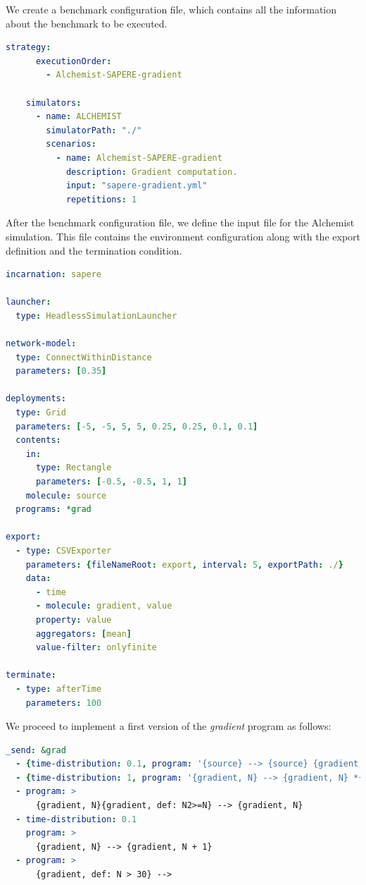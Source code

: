 \documentclass[12pt,a4paper,openright,twoside]{book}
\begin{document}
We create a benchmark configuration file, which contains all the information about the benchmark to be executed.

\begin{lstlisting}[language=yaml, caption={Case of study: benchmark configuration file.}]
    strategy:
      executionOrder:
        - Alchemist-SAPERE-gradient
    
    simulators:
      - name: ALCHEMIST
        simulatorPath: "./"
        scenarios:
          - name: Alchemist-SAPERE-gradient
            description: Gradient computation.
            input: "sapere-gradient.yml"
            repetitions: 1
\end{lstlisting}

After the benchmark configuration file, we define the input file for the Alchemist simulation.
This file contains the environment configuration along with the export definition and the termination condition.

\begin{lstlisting}[language=yaml, caption={Case of study: Alchemist input file.}]
incarnation: sapere

launcher:
  type: HeadlessSimulationLauncher

network-model:
  type: ConnectWithinDistance
  parameters: [0.35]

deployments:
  type: Grid
  parameters: [-5, -5, 5, 5, 0.25, 0.25, 0.1, 0.1]
  contents:
    in:
      type: Rectangle
      parameters: [-0.5, -0.5, 1, 1]
    molecule: source
  programs: *grad
  
export:
  - type: CSVExporter
    parameters: {fileNameRoot: export, interval: 5, exportPath: ./}
    data: 
      - time
      - molecule: gradient, value
      property: value
      aggregators: [mean]
      value-filter: onlyfinite

terminate:
  - type: afterTime
    parameters: 100
\end{lstlisting}

We proceed to implement a first version of the \emph{gradient} program as follows:

\begin{lstlisting}[language=yaml, caption={Case of study: gradient program A.}]
_send: &grad
  - {time-distribution: 0.1, program: '{source} --> {source} {gradient, 0}'}
  - {time-distribution: 1, program: '{gradient, N} --> {gradient, N} *{gradient, N+#D}'}
  - program: >
      {gradient, N}{gradient, def: N2>=N} --> {gradient, N}
  - time-distribution: 0.1
    program: >
      {gradient, N} --> {gradient, N + 1}
  - program: >
      {gradient, def: N > 30} -->
    \end{lstlisting}
\end{document}
